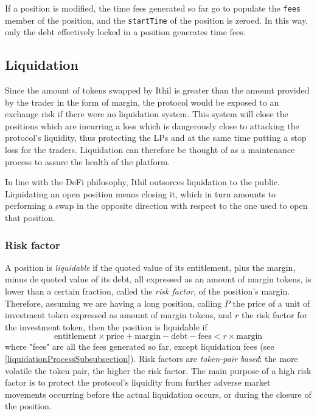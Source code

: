 \documentclass [10pt, fancyhdr, twoside] {article}
\begin{document}
If a position is modified, the time fees generated so far go to populate the \verb|fees| member of the position, and the \verb|startTime| of the position is zeroed. In this way, only the debt effectively locked in a position generates time fees.

\subsection{Liquidation}\label{liquidationSubsection}

Since the amount of tokens swapped by Ithil is greater than the amount provided by the trader in the form of margin, the protocol would be exposed to an exchange risk if there were no liquidation system. This system will close the positions which are incurring a loss which is dangerously close to attacking the protocol's liquidity, thus protecting the LPs and at the same time putting a stop loss for the traders. Liquidation can therefore be thought of as a maintenance process to assure the health of the platform.

In line with the DeFi philosophy, Ithil outsorces liquidation to the public. Liquidating an open position means closing it, which in turn amounts to performing a swap in the opposite direction with respect to the one used to open that position.

\subsubsection{Risk factor}\label{riskFactorSubsubsection}

A position is \textit{liquidable} if the quoted value of its entitlement, plus the margin, minus de quoted value of its debt, all expressed as an amount of margin tokens, is lower than a certain fraction, called the \textit{risk factor}, of the position's margin. Therefore, assuming we are having a long position, calling $P$ the price of a unit of investment token expressed as amount of margin tokens, and $r$ the risk factor for the investment token, then the position is liquidable if
\begin{equation}\label{liquidableEq}
\text{entitlement} \times \text{price} + \text{margin} - \text{debt} - \text{fees} < r \times \text{margin}
\end{equation}
where "fees" are all the fees generated so far, except liquidation fees (see \ref{liquidationProcessSubsubsection}).
Risk factors are \textit{token-pair based}: the more volatile the token pair, the higher the risk factor. The main purpose of a high risk factor is to protect the protocol's liquidity from further adverse market movements occurring before the actual liquidation occurs, or during the closure of the position.
\end{document}
